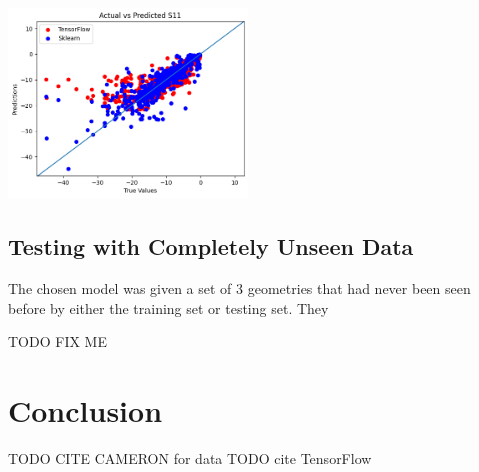 \documentclass[lettersize,journal]{IEEEtran}
\newenvironment{Figure}
    {\par\medskip\noindent\minipage{\linewidth}}
    {\endminipage\par\medskip}
\begin{document}
\begin{Figure}
    \centering
    \includegraphics[width=2.5in]{actual_vs_predicted_s11}
    \label{actual_vs_predicted_s11}
\end{Figure}

\subsection{Testing with Completely Unseen Data}
The chosen model was given a set of 3 geometries that had never been seen before by either the training set or testing set. They 

TODO FIX ME 


\section{Conclusion}

TODO CITE CAMERON for data
TODO cite TensorFlow





\vfill
\end{document}
